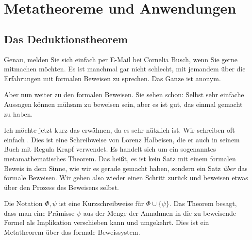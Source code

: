 \section{Metatheoreme und Anwendungen}
\subsection{Das Deduktionstheorem}

\begin{spoken-clean}[00:47:22 - 00:48:37]
Genau, melden Sie sich einfach per E-Mail bei Cornelia Busch, wenn Sie gerne mitmachen möchten. Es ist manchmal gar nicht schlecht, mit jemandem über die Erfahrungen mit formalen Beweisen zu sprechen. Das Ganze ist anonym.

Aber nun weiter zu den formalen Beweisen. Sie sehen schon: Selbst sehr einfache Aussagen können mühsam zu beweisen sein, aber es ist gut, das einmal gemacht zu haben.

Ich möchte jetzt kurz das  erwähnen, da es sehr nützlich ist. Wir schreiben oft einfach . Dies ist eine Schreibweise von Lorenz Halbeisen, die er auch in seinem Buch mit Regula Krapf verwendet. Es handelt sich um ein sogenanntes metamathematisches Theorem. Das heißt, es ist kein Satz mit einem formalen Beweis in dem Sinne, wie wir es gerade gemacht haben, sondern ein Satz \emph{über} das formale Beweisen. Wir gehen also wieder einen Schritt zurück und beweisen etwas über den Prozess des Beweisens selbst.
\end{spoken-clean}

\begin{math-stroke}

\begin{explanation-of-steps}
Die Notation $\Phi, \psi$ ist eine Kurzschreibweise für $\Phi \cup \{\psi\}$. Das Theorem besagt, dass man eine Prämisse $\psi$ aus der Menge der Annahmen in die zu beweisende Formel als Implikation verschieben kann und umgekehrt. Dies ist ein Metatheorem über das formale Beweissystem.
\end{explanation-of-steps}
\end{math-stroke}

